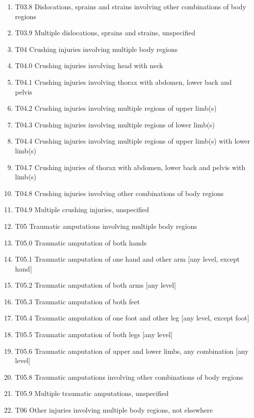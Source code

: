 \documentclass[
]{scrartcl}
\begin{document}
\begin{itemize}
\begin{enumerate}
  \item
    T03.8 Dislocations, sprains and strains involving other combinations
    of body regions
  \item
    T03.9 Multiple dislocations, sprains and strains, unspecified
  \item
    T04 Crushing injuries involving multiple body regions
  \item
    T04.0 Crushing injuries involving head with neck
  \item
    T04.1 Crushing injuries involving thorax with abdomen, lower back
    and pelvis
  \item
    T04.2 Crushing injuries involving multiple regions of upper limb(s)
  \item
    T04.3 Crushing injuries involving multiple regions of lower limb(s)
  \item
    T04.4 Crushing injuries involving multiple regions of upper limb(s)
    with lower limb(s)
  \item
    T04.7 Crushing injuries of thorax with abdomen, lower back and
    pelvis with limb(s)
  \item
    T04.8 Crushing injuries involving other combinations of body regions
  \item
    T04.9 Multiple crushing injuries, unspecified
  \item
    T05 Traumatic amputations involving multiple body regions
  \item
    T05.0 Traumatic amputation of both hands
  \item
    T05.1 Traumatic amputation of one hand and other arm {[}any level,
    except hand{]}
  \item
    T05.2 Traumatic amputation of both arms {[}any level{]}
  \item
    T05.3 Traumatic amputation of both feet
  \item
    T05.4 Traumatic amputation of one foot and other leg {[}any level,
    except foot{]}
  \item
    T05.5 Traumatic amputation of both legs {[}any level{]}
  \item
    T05.6 Traumatic amputation of upper and lower limbs, any combination
    {[}any level{]}
  \item
    T05.8 Traumatic amputations involving other combinations of body
    regions
  \item
    T05.9 Multiple traumatic amputations, unspecified
  \item
    T06 Other injuries involving multiple body regions, not elsewhere

\end{enumerate}
\end{itemize}
\end{document}
